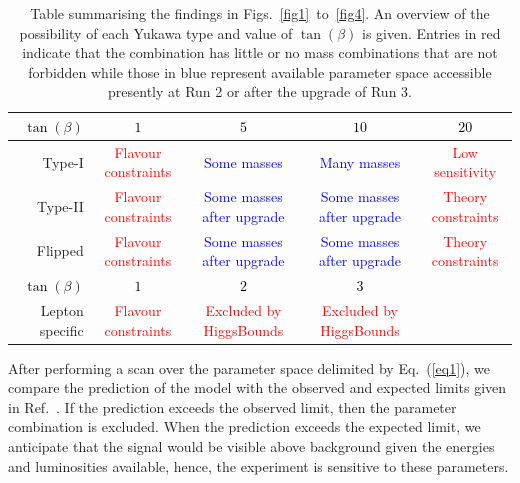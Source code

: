 \begin{table}
\begin{tabularx}{\textwidth}{RCCCC}
      \toprule
      \textcolor{black}{\(\tan(\beta)\)}& \textcolor{black}{\(1\)} & \textcolor{black}{\(5\)} & \textcolor{black}{\(10\)} & \textcolor{black}{\(20\)}\\
      \toprule
      Type-I & \textcolor{red}{Flavour constraints} & \textcolor{blue}{Some masses} & \textcolor{blue}{Many masses} & \textcolor{red}{Low sensitivity} \\
      \hline
      Type-II &\textcolor{red}{Flavour constraints} & \textcolor{blue}{Some masses after upgrade} & \textcolor{blue}{Some masses after upgrade} & \textcolor{red}{Theory constraints}\\
      \hline
      Flipped &\textcolor{red}{Flavour constraints} & \textcolor{blue}{Some masses after upgrade} & \textcolor{blue}{Some masses after upgrade} & \textcolor{red}{Theory constraints}\\
      \toprule
      \textcolor{black}{\(\tan(\beta)\)}& \textcolor{black}{\(1\)} & \textcolor{black}{\(2\)} & \textcolor{black}{\(3\)} & \\
      \toprule
      Lepton specific & \textcolor{red}{Flavour constraints} & \textcolor{red}{Excluded by HiggsBounds} &  \textcolor{red}{Excluded by HiggsBounds} & \\
\end{tabularx}
\caption{Table summarising the findings in Figs.~\ref{fig1}~to~\ref{fig4}.
An overview of the possibility of each Yukawa type and value of \(\tan(\beta)\) is given.
Entries in red indicate that the combination has little or no mass combinations that are not forbidden while those in blue represent available parameter space accessible presently at Run 2  or after the upgrade of Run 3.}
\label{tab:summary}
\end{table}

After performing a scan over the parameter space delimited by Eq.~(\ref{eq1}), we compare the prediction of the model with the observed and expected limits given in Ref.~\cite{Aaboud:2018eoy}.
If the prediction exceeds the observed limit, then the parameter combination is excluded.
When the prediction exceeds the expected limit, we anticipate that the signal would be visible above background given the energies and luminosities available, hence,  {the experiment is sensitive to these parameters.} %




